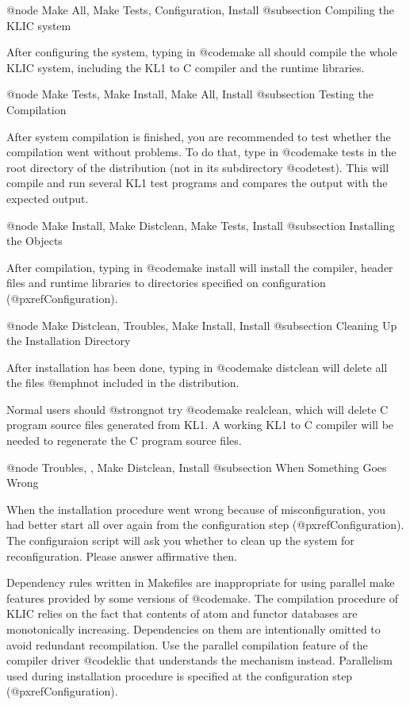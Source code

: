 {{{{@node Make All, Make Tests, Configuration, Install
@subsection Compiling the KLIC system

After configuring the system, typing in @code{make all} should compile
the whole KLIC system, including the KL1 to C compiler and the runtime
libraries.

@node Make Tests, Make Install, Make All, Install
@subsection Testing the Compilation

After system compilation is finished, you are recommended to test
whether the compilation went without problems.  To do that, type in
@code{make tests} in the root directory of the distribution (not in its
subdirectory @code{test}).  This will compile and run several KL1 test
programs and compares the output with the expected output.

@node Make Install, Make Distclean, Make Tests, Install
@subsection Installing the Objects

After compilation, typing in @code{make install} will install the
compiler, header files and runtime libraries to directories specified on
configuration (@pxref{Configuration}).

@node Make Distclean, Troubles, Make Install, Install
@subsection Cleaning Up the Installation Directory

After installation has been done, typing in @code{make distclean} will
delete all the files @emph{not} included in the distribution.

Normal users should @strong{not} try @code{make realclean}, which will
delete C program source files generated from KL1.  A working KL1 to C
compiler will be needed to regenerate the C program source files.

@node Troubles,  , Make Distclean, Install
@subsection When Something Goes Wrong

When the installation procedure went wrong because of misconfiguration,
you had better start all over again from the configuration step
(@pxref{Configuration}).  The configuraion script will ask you whether
to clean up the system for reconfiguration.  Please answer affirmative
then.

Dependency rules written in Makefiles are inappropriate for using
parallel make features provided by some versions of @code{make}.  The
compilation procedure of KLIC relies on the fact that contents of atom
and functor databases are monotonically increasing.  Dependencies on
them are intentionally omitted to avoid redundant recompilation.  Use
the parallel compilation feature of the compiler driver @code{klic} that
understands the mechanism instead.  Parallelism used during installation
procedure is specified at the configuration step
(@pxref{Configuration}).

}}}}
